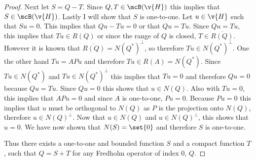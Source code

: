\documentclass[11pt, oneside]{article}
\begin{document}
\begin{enumerate}
\begin{proof}
      Next let $S = Q - T$.
      Since $Q, T \in \mcB(\v{H})$ this implies that $S \in \mcB(\v{H})$.
      Lastly I will show that $S$ is one-to-one.
      Let $u \in \v{H}$ such that $Su = 0$.
      This implies that $Qu - Tu = 0$ or that $Qu = Tu$.
      Since $Qu = Tu$, this implies that $Tu \in R(Q)$ or since the
      range of $Q$ is closed, $T \in \overline{R(Q)}$.
      However it is known that $\overline{R(Q)} = N(Q^*)^{\perp}$, so therefore
      $Tu \in N(Q^*)^{\perp}$.
      One the other hand $Tu = APu$ and therefore $Tu \in R(A) = N(Q^*)$.
      Since $Tu \in N(Q^*)$ and $Tu \in N(Q^*)^{\perp}$ this implies that
      $Tu = 0$ and therefore $Qu = 0$ because $Qu = Tu$.
      Since $Qu = 0$ this shows that $u \in N(Q)$.
      Also with $Tu = 0$, this implies that $APu = 0$ and since $A$ is
      one-to-one, $Pu = 0$.
      Because $Pu = 0$ this implies that $u$ must be orthogonal to $N(Q)$ as
      $P$ is the projection onto $N(Q)$, therefore $u \in N(Q)^{\perp}$.
      Now that $u \in N(Q)$ and $u \in N(Q)^{\perp}$, this shows that $u = 0$.
      We have now shown that $N(S) = \set{0}$ and therefore $S$ is one-to-one.

      Thus there exists a one-to-one and bounded function $S$ and a compact
      function $T$, such that $Q = S + T$ for any Fredholm operator of index 0,
      $Q$.
    \end{proof}

\end{enumerate}
\end{document}
